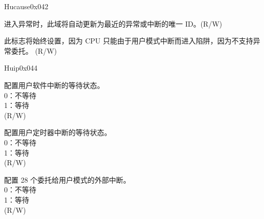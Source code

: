 \begin{register}{H}{ucause}{0x042}\label{regdesc:UCAUSE}
%
%
%
\regnewline%
\begin{regdesc}\begin{reglist}
\label{fielddesc:UCAUSECODE}\item [Interrupt ID] 进入异常时，此域将自动更新为最近的异常或中断的唯一 ID。(R/W)
\label{fielddesc:UCAUSEINT}\item [Interrupt Flag] 此标志将始终设置，因为 CPU 只能由于用户模式中断而进入陷阱，因为不支持异常委托。  (R/W)
\end{reglist}\end{regdesc}
\end{register}

\begin{register}{H}{uip}{0x044}\label{regdesc:UIP}
%
%
%
%
%
%
%
\regnewline%
\begin{regdesc}\begin{reglist}
\label{fielddesc:UIPUSIP}\item [USIP] 配置用户软件中断的等待状态。 \\
0：不等待\\
1：等待\\
(R/W)
\label{fielddesc:UIPUTIP}\item [UTIP] 配置用户定时器中断的等待状态。\\
0：不等待\\
1：等待\\
(R/W)
\label{fielddesc:UIPUXIP}\item [UXIP] 配置 28 个委托给用户模式的外部中断。\\
0：不等待\\
1：等待\\
(R/W)
\end{reglist}\end{regdesc}
\end{register}

